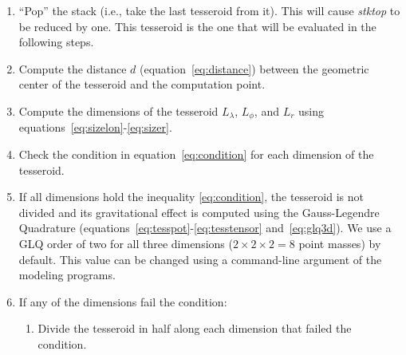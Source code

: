 \documentclass[paper,twocolumn,twoside]{geophysics}
\begin{document}
\begin{enumerate}
    \item ``Pop'' the stack (i.e., take the last tesseroid from it).
        This will cause \emph{stktop} to be reduced by one.
        This tesseroid is the one that will be evaluated in the following
        steps.
    \item Compute the distance $d$ (equation~\ref{eq:distance}) between
        the geometric center of the tesseroid and
        the computation point.
    \item Compute the dimensions of the tesseroid $L_\lambda$, $L_\phi$,
        and $L_r$ using equations~\ref{eq:sizelon}-\ref{eq:sizer}.
    \item Check the condition in equation~\ref{eq:condition} for each
        dimension of the tesseroid.



    \item If all dimensions hold the inequality \ref{eq:condition},
        the tesseroid is not divided and its
        gravitational effect is computed using the
        Gauss-Legendre Quadrature
        (equations~\ref{eq:tesspot}-\ref{eq:tesstensor} and~\ref{eq:glq3d}).
        We use a GLQ order of two for all three dimensions
        ($2 \times 2 \times 2 = 8$ point masses)
        by default.
        This value can be changed using
        a command-line argument of the modeling programs.
    \item If any of the dimensions fail the condition:
    \begin{enumerate}
        \item Divide the tesseroid in half along each dimension that failed
             the condition.

\end{enumerate}
\end{enumerate}
\end{document}
